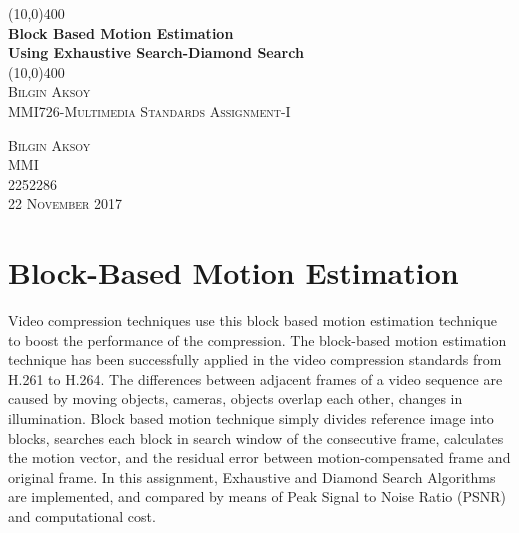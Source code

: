 \documentclass[]{article}
\title{}
\author{}
\begin{document}
\begin{titlepage}
	\begin{center}
		\line(10,0){400}\\
		[4mm] %
		\huge{\bfseries Block Based Motion Estimation} \\
		\huge{\bfseries Using Exhaustive Search-Diamond Search} \\
		[1mm]
		\line(10,0){400}\\
		[1 cm]
		\textsc{\LARGE Bilgin Aksoy}\\
		[1 cm]
		\textsc{\large MMI726-Multimedia Standards Assignment-I}\\
		[10 cm]
	\end{center}
	
	\begin{flushright}
		\textsc{\large Bilgin Aksoy\\
		MMI\\
		2252286\\
		22 November 2017\\
		}
	\end{flushright}
\end{titlepage} 
\setcounter{page}{1}



\section{Block-Based Motion Estimation}
	\justifying Video compression techniques use this block based motion estimation technique to boost the performance of the compression.  The block-based motion estimation technique has been successfully applied in the video compression standards from H.261 to H.264.  \cite{bachu2015review}The differences between adjacent frames of a video sequence are caused by moving objects, cameras, objects overlap each other, changes in illumination.\cite{andrey2016research} Block based motion technique simply divides reference image into blocks, searches each block in search window of the consecutive frame, calculates the motion vector, and the residual error between motion-compensated frame and original frame. In this assignment, Exhaustive and Diamond Search Algorithms are implemented, and compared by means of Peak Signal to Noise Ratio (PSNR) and computational cost. \\
\end{document}

